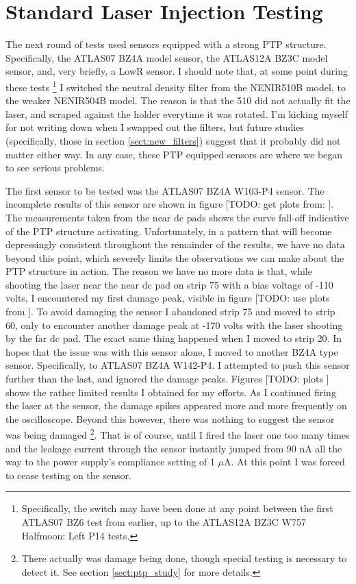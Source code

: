 \documentclass{report}
\begin{document}
        \section{Standard Laser Injection Testing} \label{sect:std_tests}
            The next round of tests used sensors equipped with a strong PTP structure. Specifically, the ATLAS07 BZ4A model sensor, the ATLAS12A BZ3C model sensor, and, very briefly, a LowR sensor. I should note that, at some point during these tests \footnote{Specifically, the switch may have been done at any point between the first ATLAS07 BZ6 test from earlier, up to the ATLAS12A BZ3C W757 Halfmoon: Left P14 tests.} I switched the neutral density filter from the NENIR510B model, to the weaker NENIR504B model. The reason is that the 510 did not actually fit the laser, and scraped against the holder everytime it was rotated. I'm kicking myself for not writing down when I swapped out the filters, but future studies (specifically, those in section \ref{sect:new_filters}) suggest that it probably did not matter either way. In any case, these PTP equipped sensors are where we began to see serious problems.
            
            The first sensor to be tested was the ATLAS07 BZ4A W103-P4 sensor. The incomplete results of this sensor are shown in figure [TODO: get plots from:
            ]. The measurements taken from the near dc pads shows the curve fall-off indicative of the PTP structure activating. Unfortunately, in a pattern that will become depressingly consistent throughout the remainder of the results, we have no data beyond this point, which severely limits the observations we can make about the PTP structure in action. The reason we have no more data is that, while shooting the laser near the near dc pad on strip 75 with a bias voltage of -110 volts, I encountered my first damage peak, visible in figure [TODO: use plots from
            ]. To avoid damaging the sensor I abandoned strip 75 and moved to strip 60, only to encounter another damage peak at -170 volts with the laser shooting by the far dc pad. The exact same thing happened when I moved to strip 20. In hopes that the issue was with this sensor alone, I moved to another BZ4A type sensor. Specifically, to ATLAS07 BZ4A W142-P4. I attempted to push this sensor further than the last, and ignored the damage peaks. Figures [TODO: plots
            ] shows the rather limited results I obtained for my efforts. As I continued firing the laser at the sensor, the damage spikes appeared more and more frequently on the oscilloscope. Beyond this however, there was nothing to suggest the sensor was being damaged \footnote{There actually was damage being done, though special testing is necessary to detect it. See section \ref{sect:ptp_study} for more details.}. That is of course, until I fired the laser one too many times and the leakage current through the sensor instantly jumped from 90 nA all the way to the power supply's compliance setting of 1 $\mu$A. At this point I was forced to cease testing on the sensor.
\end{document}
